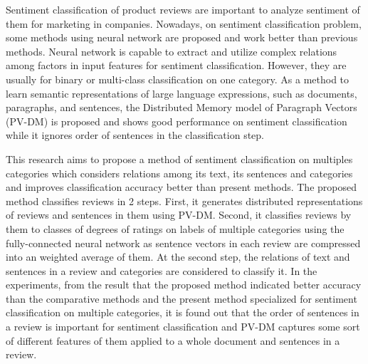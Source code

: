 Sentiment classification of product reviews are important
to analyze sentiment of them for marketing in companies.
%
Nowadays, on sentiment classification problem,
some methods using neural network are proposed
and work better than previous methods.
Neural network is capable to extract and utilize complex relations
among factors in input features for sentiment classification.
However, they are usually for binary or multi-class classification
on one category.
%
As a method to learn semantic representations of large language expressions,
such as documents, paragraphs, and sentences,
the Distributed  Memory model of Paragraph Vectors (PV-DM) is proposed
and shows good performance on sentiment classification
while it ignores order of sentences in the classification step.

This research aims to propose a method of sentiment classification
on multiples categories
which considers relations among its text, its sentences and categories
and improves classification accuracy better than present methods.
%
The proposed method classifies reviews in 2 steps.
First, it generates distributed representations of reviews and sentences
in them using PV-DM.
Second, it classifies reviews by them to classes of degrees of ratings
on labels of multiple categories using the fully-connected neural network
as sentence vectors in each review are compressed
into an weighted average of them.
At the second step, the relations of text and sentences in a review
and categories are considered to classify it.
%
In the experiments, from the result that
the proposed method indicated better accuracy
than the comparative methods and the present method specialized
for sentiment classification on multiple categories,
it is found out that
the order of sentences in a review is important for sentiment classification
and PV-DM captures some sort of different features of them
applied to a whole document and sentences in a review.
